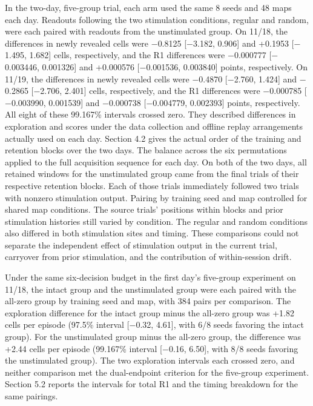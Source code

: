 \documentclass{article}
\begin{document}
In the two-day, five-group trial, each arm used the same 8 seeds and 48 maps each day. Readouts following the two stimulation conditions, regular and random, were each paired with readouts from the unstimulated group. On 11/18, the differences in newly revealed cells were \ensuremath{-}0.8125 [\ensuremath{-}3.182, 0.906] and +0.1953 [\ensuremath{-}1.495, 1.682] cells, respectively, and the R1 differences were \ensuremath{-}0.000777 [\ensuremath{-}0.003446, 0.001326] and +0.000576 [\ensuremath{-}0.001536, 0.003840] points, respectively. On 11/19, the differences in newly revealed cells were \ensuremath{-}0.4870 [\ensuremath{-}2.760, 1.424] and \ensuremath{-}0.2865 [\ensuremath{-}2.706, 2.401] cells, respectively, and the R1 differences were \ensuremath{-}0.000785 [\ensuremath{-}0.003990, 0.001539] and \ensuremath{-}0.000738 [\ensuremath{-}0.004779, 0.002393] points, respectively. All eight of these 99.167\% intervals crossed zero. They described differences in exploration and scores under the data collection and offline replay arrangements actually used on each day. Section 4.2 gives the actual order of the training and retention blocks over the two days. The balance across the six permutations applied to the full acquisition sequence for each day. On both of the two days, all retained windows for the unstimulated group came from the final trials of their respective retention blocks. Each of those trials immediately followed two trials with nonzero stimulation output. Pairing by training seed and map controlled for shared map conditions. The source trials’ positions within blocks and prior stimulation histories still varied by condition. The regular and random conditions also differed in both stimulation sites and timing. These comparisons could not separate the independent effect of stimulation output in the current trial, carryover from prior stimulation, and the contribution of within-session drift.


Under the same six-decision budget in the first day's five-group experiment on 11/18, the intact group and the unstimulated group were each paired with the all-zero group by training seed and map, with 384 pairs per comparison. The exploration difference for the intact group minus the all-zero group was +1.82 cells per episode (97.5\% interval [\ensuremath{-}0.32, 4.61], with 6/8 seeds favoring the intact group). For the unstimulated group minus the all-zero group, the difference was +2.44 cells per episode (99.167\% interval [\ensuremath{-}0.16, 6.50], with 8/8 seeds favoring the unstimulated group). The two exploration intervals each crossed zero, and neither comparison met the dual-endpoint criterion for the five-group experiment. Section 5.2 reports the intervals for total R1 and the timing breakdown for the same pairings.
\end{document}
